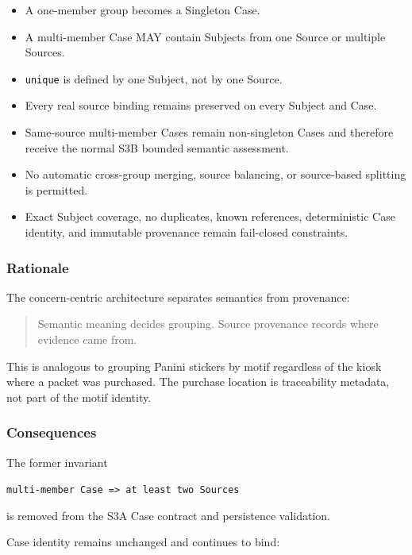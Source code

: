 \begin{itemize}
\tightlist
\item
  A one-member group becomes a Singleton Case.
\item
  A multi-member Case MAY contain Subjects from one Source or multiple Sources.
\item
  \texttt{unique} is defined by one Subject, not by one Source.
\item
  Every real source binding remains preserved on every Subject and Case.
\item
  Same-source multi-member Cases remain non-singleton Cases and therefore receive the normal S3B bounded semantic assessment.
\item
  No automatic cross-group merging, source balancing, or source-based splitting is permitted.
\item
  Exact Subject coverage, no duplicates, known references, deterministic Case identity, and immutable provenance remain fail-closed constraints.
\end{itemize}

\hypertarget{rationale}{%
\subsubsection{Rationale}\label{rationale}}

The concern-centric architecture separates semantics from provenance:

\begin{quote}
Semantic meaning decides grouping. Source provenance records where evidence came from.
\end{quote}

This is analogous to grouping Panini stickers by motif regardless of the kiosk where a packet was purchased. The purchase location is traceability metadata, not part of the motif identity.

\hypertarget{consequences-17}{%
\subsubsection{Consequences}\label{consequences-17}}

The former invariant

\texttt{multi-member\ Case\ =\textgreater{}\ at\ least\ two\ Sources}

is removed from the S3A Case contract and persistence validation.

Case identity remains unchanged and continues to bind:


